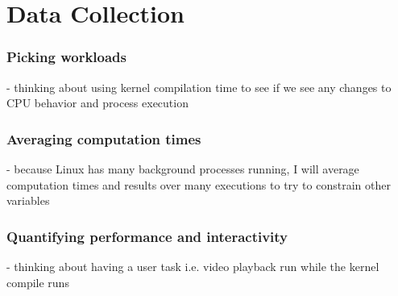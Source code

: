\documentclass[12pt]{article}
\begin{document}
\section*{Data Collection}

\subsubsection*{Picking workloads}

- thinking about using kernel compilation time to see if we see any changes to CPU behavior and process execution

\subsubsection*{Averaging computation times}

- because Linux has many background processes running, I will average computation times and results over many executions to try to constrain other variables

\subsubsection*{Quantifying performance and interactivity}

- thinking about having a user task i.e. video playback run while the kernel compile runs

 









\end{document}
